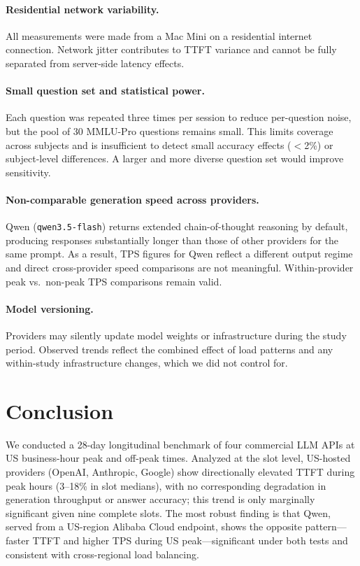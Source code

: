 \documentclass[11pt]{article}
\begin{document}
\paragraph{Residential network variability.}
All measurements were made from a Mac Mini on a residential internet connection.
Network jitter contributes to TTFT variance and cannot be fully separated from server-side
latency effects.

\paragraph{Small question set and statistical power.}
Each question was repeated three times per session to reduce per-question noise, but the
pool of 30 MMLU-Pro questions remains small.
This limits coverage across subjects and is insufficient to detect small accuracy effects
($<$2\%) or subject-level differences. A larger and more diverse question set would
improve sensitivity.

\paragraph{Non-comparable generation speed across providers.}
Qwen (\texttt{qwen3.5-flash}) returns extended chain-of-thought reasoning by default,
producing responses substantially longer than those of other providers for the same prompt.
As a result, TPS figures for Qwen reflect a different output regime and direct
cross-provider speed comparisons are not meaningful.
Within-provider peak vs.\ non-peak TPS comparisons remain valid.

\paragraph{Model versioning.}
Providers may silently update model weights or infrastructure during the study period.
Observed trends reflect the combined effect of load patterns and any within-study
infrastructure changes, which we did not control for.

\section{Conclusion}

We conducted a 28-day longitudinal benchmark of four commercial LLM APIs at US business-hour
peak and off-peak times.
Analyzed at the slot level, US-hosted providers (OpenAI, Anthropic, Google) show
directionally elevated TTFT during peak hours (3--18\% in slot medians), with no
corresponding degradation in generation throughput or answer accuracy; this trend is only
marginally significant given nine complete slots.
The most robust finding is that Qwen, served from a US-region Alibaba Cloud endpoint, shows
the opposite pattern---faster TTFT and higher TPS during US peak---significant under both
tests and consistent with cross-regional load balancing.
\end{document}
